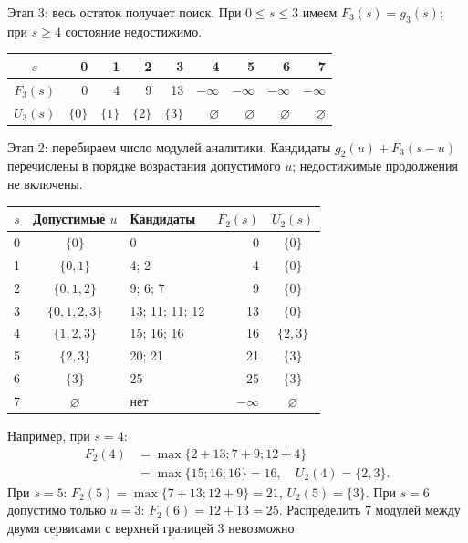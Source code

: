 \documentclass[12pt,a4paper]{article}
\begin{document}
Этап 3: весь остаток получает поиск. При $0\le s\le3$ имеем
$F_3(s)=g_3(s)$; при $s\ge4$ состояние недостижимо.
\begin{center}\begin{tabular}{c|rrrrrrrr}
$s$&0&1&2&3&4&5&6&7\\\hline
$F_3(s)$&0&4&9&13&$-\infty$&$-\infty$&$-\infty$&$-\infty$\\
$U_3(s)$&$\{0\}$&$\{1\}$&$\{2\}$&$\{3\}$&$\varnothing$&$\varnothing$&$\varnothing$&$\varnothing$
\end{tabular}\end{center}

Этап 2: перебираем число модулей аналитики. Кандидаты
$g_2(u)+F_3(s-u)$ перечислены в порядке возрастания допустимого $u$;
недостижимые продолжения не включены.
\begin{center}\begin{tabular}{c|c|l|r|c}
$s$&Допустимые $u$&Кандидаты&$F_2(s)$&$U_2(s)$\\\hline
0&$\{0\}$&0&0&$\{0\}$\\
1&$\{0,1\}$&4; 2&4&$\{0\}$\\
2&$\{0,1,2\}$&9; 6; 7&9&$\{0\}$\\
3&$\{0,1,2,3\}$&13; 11; 11; 12&13&$\{0\}$\\
4&$\{1,2,3\}$&15; 16; 16&16&$\{2,3\}$\\
5&$\{2,3\}$&20; 21&21&$\{3\}$\\
6&$\{3\}$&25&25&$\{3\}$\\
7&$\varnothing$&нет&$-\infty$&$\varnothing$
\end{tabular}\end{center}
Например, при $s=4$:
\begin{align*}
F_2(4)&=\max\{2+13;7+9;12+4\}\\
&=\max\{15;16;16\}=16,\quad U_2(4)=\{2,3\}.
\end{align*}
При $s=5$: $F_2(5)=\max\{7+13;12+9\}=21$, $U_2(5)=\{3\}$.
При $s=6$ допустимо только $u=3$: $F_2(6)=12+13=25$.
Распределить 7 модулей между двумя сервисами с верхней границей 3 невозможно.
\end{document}
